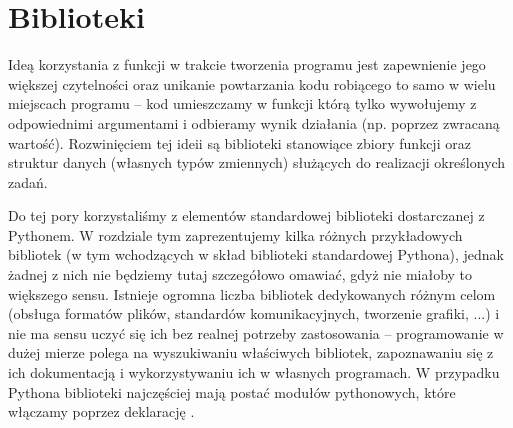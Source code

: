 % 
% 
% 
% 

\section{Biblioteki}

Ideą korzystania z funkcji w trakcie tworzenia programu jest zapewnienie jego większej czytelności oraz unikanie powtarzania kodu robiącego to samo w wielu miejscach programu – kod umieszczamy w funkcji którą tylko wywołujemy z odpowiednimi argumentami i odbieramy wynik działania (np. poprzez zwracaną wartość). Rozwinięciem tej ideii są biblioteki stanowiące zbiory funkcji oraz struktur danych (własnych typów zmiennych) służących do realizacji określonych zadań.

Do tej pory korzystaliśmy z elementów standardowej biblioteki dostarczanej z Pythonem. W rozdziale tym zaprezentujemy kilka różnych przykładowych bibliotek (w tym wchodzących w skład biblioteki standardowej Pythona), jednak żadnej z nich nie będziemy tutaj szczegółowo omawiać, gdyż nie miałoby to większego sensu. Istnieje ogromna liczba bibliotek dedykowanych różnym celom (obsługa formatów plików, standardów komunikacyjnych, tworzenie grafiki, ...) i nie ma sensu uczyć się ich bez realnej potrzeby zastosowania – programowanie w dużej mierze polega na wyszukiwaniu właściwych bibliotek, zapoznawaniu się z ich dokumentacją i wykorzystywaniu ich w własnych programach. W przypadku Pythona biblioteki najczęściej mają postać modułów pythonowych, które włączamy poprzez deklarację .


